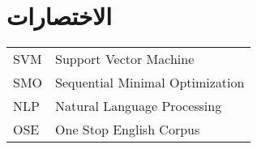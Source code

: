 

\chapter*{الاختصارات}

\begin{doublespacing}
	\begin{center}
		\begin{english}
			\begin{longtable}{l l}
				SVM		&		Support Vector Machine \\
				SMO		&		Sequential Minimal Optimization \\
				NLP		 &		Natural Language Processing \\
				OSE		&		One Stop English Corpus \\
			\end{longtable}
		\end{english}
	\end{center}
\end{doublespacing}

